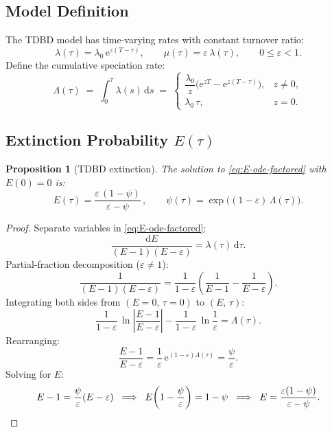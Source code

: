 \documentclass[11pt,a4paper]{article}
\newcommand{\dd}{\mathrm{d}}
\newcommand{\ee}{\mathrm{e}}
\newcommand{\eps}{\varepsilon}
\newcommand{\Lam}{\Lambda}
\theoremstyle{plain}
\newtheorem{proposition}{Proposition}
\theoremstyle{definition}
\theoremstyle{remark}
\begin{document}
\subsection{Model Definition}

The TDBD model has time-varying rates with constant turnover ratio:
\[
  \lambda(\tau) = \lambda_0 \,\ee^{z(T - \tau)}, \qquad \mu(\tau) = \eps\,\lambda(\tau), \qquad 0 \le \eps < 1.
\]
Define the cumulative speciation rate:
\begin{equation}\label{eq:Lambda}
  \Lam(\tau) \;=\; \int_0^{\tau} \lambda(s)\,\dd s
  \;=\; \begin{cases}
    \dfrac{\lambda_0}{z}\bigl(\ee^{zT} - \ee^{z(T-\tau)}\bigr), & z \neq 0, \\[6pt]
    \lambda_0\,\tau, & z = 0.
  \end{cases}
\end{equation}

\subsection{Extinction Probability $E(\tau)$}

\begin{proposition}[TDBD extinction]\label{prop:tdbd-E}
The solution to \eqref{eq:E-ode-factored} with $E(0) = 0$ is:
\begin{equation}\label{eq:tdbd-E}
  \boxed{E(\tau) = \frac{\eps\,(1 - \psi)}{\ \eps - \psi\ }}\,,
  \qquad \psi(\tau) = \exp\!\bigl((1-\eps)\,\Lam(\tau)\bigr).
\end{equation}
\end{proposition}

\begin{proof}
Separate variables in \eqref{eq:E-ode-factored}:
\[
  \frac{\dd E}{(E - 1)(E - \eps)} = \lambda(\tau)\,\dd\tau.
\]
Partial-fraction decomposition ($\eps \neq 1$):
\[
  \frac{1}{(E-1)(E-\eps)} = \frac{1}{1 - \eps}\left(\frac{1}{E - 1} - \frac{1}{E - \eps}\right).
\]
Integrating both sides from $(E=0,\,\tau=0)$ to $(E,\,\tau)$:
\[
  \frac{1}{1-\eps}\,\ln\!\left|\frac{E-1}{E-\eps}\right| - \frac{1}{1-\eps}\,\ln\!\frac{1}{\eps}
  = \Lam(\tau).
\]
Rearranging:
\[
  \frac{E - 1}{E - \eps} = \frac{1}{\eps}\,\ee^{(1-\eps)\Lam(\tau)} = \frac{\psi}{\eps}.
\]
Solving for $E$:
\[
  E - 1 = \frac{\psi}{\eps}(E - \eps)
  \;\;\Longrightarrow\;\;
  E\!\left(1 - \frac{\psi}{\eps}\right) = 1 - \psi
  \;\;\Longrightarrow\;\;
  E = \frac{\eps(1 - \psi)}{\eps - \psi}. \qedhere
\]
\end{proof}
\end{document}

